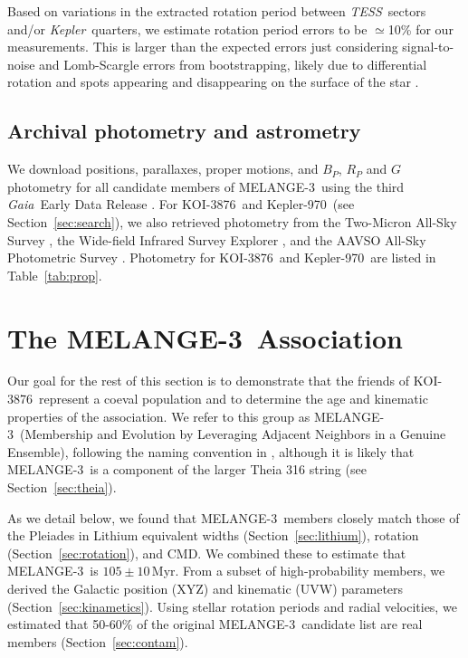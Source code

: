 \documentclass[twocolumn, linenumbers]{aastex631}
\newcommand{\association}{MELANGE-3}
\newcommand{\starname}{KOI-3876}
\newcommand{\starnametwo}{Kepler-970}
\newcommand{\kepler}{{\it Kepler}}
\newcommand{\tess}{\textit{TESS}}
\newcommand{\gaia}{\textit{Gaia}}
\begin{document}
Based on variations in the extracted rotation period between \tess\ sectors and/or \kepler\ quarters, we estimate rotation period errors to be $\simeq$10\% for our measurements. This is larger than the expected errors just considering signal-to-noise and Lomb-Scargle errors from bootstrapping, likely due to differential rotation and spots appearing and disappearing on the surface of the star \citep{2021ApJ...921..167R}.



\subsection{Archival photometry and astrometry}
We download positions, parallaxes, proper motions, and $B_P$, $R_P$ and $G$ photometry for all candidate members of \association\ using the third \gaia\ Early Data Release \citep[EDR3;][]{GaiaEDR3}. For \starname\ and \starnametwo\ (see Section~\ref{sec:search}), we also retrieved photometry from the Two-Micron All-Sky Survey \citep[2MASS;][]{Skrutskie2006}, the Wide-field Infrared Survey Explorer \citep[WISE; ][]{allwise}, and the AAVSO All-Sky Photometric Survey \citep[APASS; ][]{apass}. Photometry for \starname\ and \starnametwo\ are listed in Table~\ref{tab:prop}. 


\section{The \association\ Association}\label{sec:cluster}

Our goal for the rest of this section is to demonstrate that the friends of \starname\ represent a coeval population and to determine the age and kinematic properties of the association. We refer to this group as \association\ (Membership and Evolution by Leveraging Adjacent Neighbors in a Genuine Ensemble), following the naming convention in \citet{THYMEV}, although it is likely that \association\ is a component of the larger Theia 316 string (see Section~\ref{sec:theia}).

As we detail below, we found that \association\ members closely match those of the Pleiades in Lithium equivalent widths (Section~\ref{sec:lithium}), rotation (Section~\ref{sec:rotation}), and CMD. We combined these to estimate that \association\ is $105\pm10$\,Myr. From a subset of high-probability members, we derived the Galactic position (XYZ) and kinematic (UVW) parameters (Section~\ref{sec:kinametics}).
Using stellar rotation periods and radial velocities, we estimated that 50-60\% of the original \association\ candidate list are real members (Section~\ref{sec:contam}). 
\end{document}
